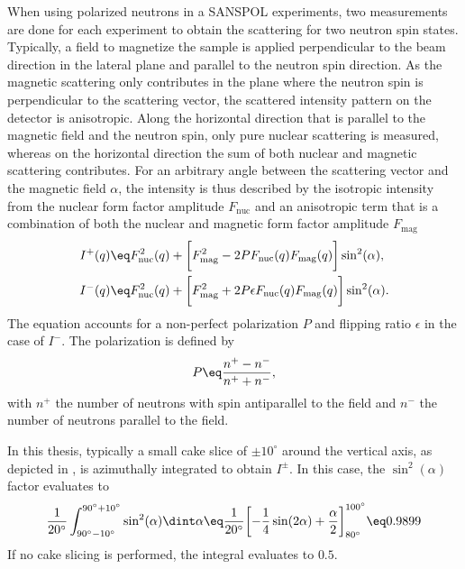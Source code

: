 \documentclass[\main/dresen_thesis.tex]{subfiles}
\begin{document}
    When using polarized neutrons in a SANSPOL experiments, two measurements are done for each experiment to obtain the scattering for two neutron spin states.
    Typically, a field to magnetize the sample is applied perpendicular to the beam direction in the lateral plane and parallel to the neutron spin direction.
    As the magnetic scattering only contributes in the plane where the neutron spin is perpendicular to the scattering vector, the scattered intensity pattern on the detector is anisotropic.
    Along the horizontal direction that is parallel to the magnetic field and the neutron spin, only pure nuclear scattering is measured, whereas on the horizontal direction the sum of both nuclear and magnetic scattering contributes.
    For an arbitrary angle between the scattering vector and the magnetic field $\alpha$, the intensity is thus described by the isotropic intensity from the nuclear form factor amplitude $F_\mathrm{nuc}$ and an anisotropic term that is a combination of both the nuclear and magnetic form factor amplitude $F_\mathrm{mag}$ \cite{Wiedenmann_2001_Small, Kohlbrecher_1997_Magne}
    \begin{align}
        I^+(q)
          &\eq F^2_\mathrm{nuc}(q) + \biggl[ F^2_\mathrm{mag} - 2 P F_\mathrm{nuc}(q) F_\mathrm{mag}(q) \biggr] \sin^2(\alpha),\\
        I^-(q)
          &\eq F^2_\mathrm{nuc}(q) + \biggl[ F^2_\mathrm{mag} + 2 P \epsilon F_\mathrm{nuc}(q) F_\mathrm{mag}(q) \biggr] \sin^2(\alpha).
    \end{align}
    The equation accounts for a non-perfect polarization $P$ and flipping ratio $\epsilon$ in the case of $I^-$.
    The polarization is defined by
    \begin{align}
      P \eq \frac{n^+ - n^-}{n^+ + n^-},
    \end{align}
    with $n^+$ the number of neutrons with spin antiparallel to the field and $n^-$ the number of neutrons parallel to the field.

    In this thesis, typically a small cake slice of $\pm 10^\circ$ around the vertical axis, as depicted in , is azimuthally integrated to obtain $I^\pm$.
    In this case, the $\sin^2(\alpha)$ factor evaluates to
    \begin{align}
      \frac{1}{20^\circ} \int_{90^\circ-10^\circ}^{90^\circ+10^\circ} \sin^2(\alpha) \dint \alpha \eq
        \frac{1}{20^\circ} \biggl[ -\frac{1}{4}\sin(2\alpha)+\frac{\alpha}{2} \biggr]_{80^\circ}^{100^\circ} \eq
        0.9899
    \end{align}
    If no cake slicing is performed, the integral evaluates to $0.5$.
\end{document}
